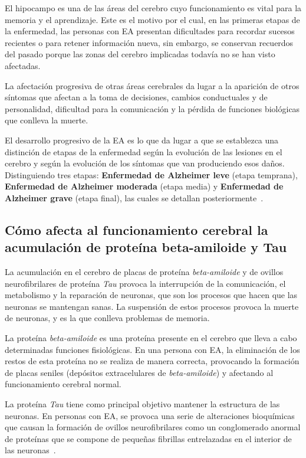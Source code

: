 El hipocampo es una de las áreas del cerebro cuyo funcionamiento es vital para la memoria y el aprendizaje.
Este es el motivo por el cual, en las primeras etapas de la enfermedad, las personas con EA presentan dificultades para
recordar sucesos recientes o para retener información nueva, sin embargo, se conservan recuerdos del pasado porque las
zonas del cerebro implicadas todavía no se han visto afectadas.

La afectación progresiva de otras áreas cerebrales da lugar a la aparición de otros síntomas que afectan a la toma de
decisiones, cambios conductuales y de personalidad, dificultad para la comunicación y la pérdida de funciones biológicas
que conlleva la muerte.

El desarrollo progresivo de la EA es lo que da lugar a que se establezca una distinción de etapas de la enfermedad según
la evolución de las lesiones en el cerebro y según la evolución de los síntomas que van produciendo esos daños.
Distinguiendo tres etapas: \textbf{Enfermedad de Alzheimer leve} (etapa temprana), \textbf{Enfermedad de Alzheimer moderada}
(etapa media) y \textbf{Enfermedad de Alzheimer grave} (etapa final), las cuales se detallan posteriormente~\cite{alz-org-etapas}.

\subsection{Cómo afecta al funcionamiento cerebral la acumulación de proteína beta-amiloide y Tau}
\label{subsec:acumulacion-proteínas}
La acumulación en el cerebro de placas de proteína \textit{beta-amiloide} y de ovillos neurofibrilares de proteína
\textit{Tau} provoca la interrupción de la comunicación, el metabolismo y la reparación de neuronas, que son los
procesos que hacen que las neuronas se mantengan sanas.
La suspensión de estos procesos provoca la muerte de neuronas, y es la que conlleva problemas de memoria.

La proteína \textit{beta-amiloide} es una proteína presente en el cerebro que lleva a cabo determinadas funciones fisiológicas.
En una persona con EA, la eliminación de los restos de esta proteína no se realiza de manera correcta, provocando la
formación de placas seniles (depósitos extracelulares de \textit{beta-amiloide}) y afectando al funcionamiento cerebral normal.

La proteína \textit{Tau} tiene como principal objetivo mantener la estructura de las neuronas.
En personas con EA, se provoca una serie de alteraciones bioquímicas que causan la formación de ovillos neurofibrilares
como un conglomerado anormal de proteínas que se compone de pequeñas fibrillas entrelazadas en el interior de las
neuronas~\cite{fund-pasqual-maragall-afectacion-cerebral}.

